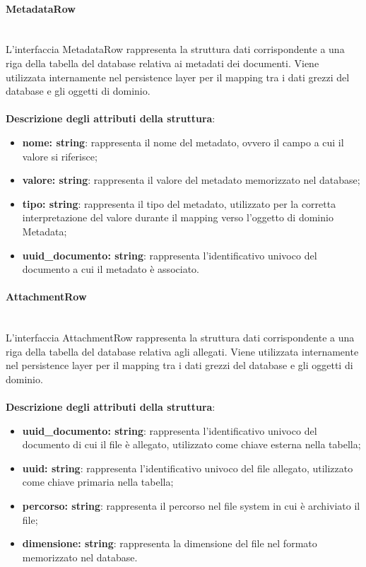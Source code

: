 \documentclass[a4paper,12pt]{article}
\begin{document}
{{{                \paragraph{MetadataRow}\label{par:MetadataRow}\mbox{}\\
                L'interfaccia MetadataRow rappresenta la struttura dati corrispondente a una riga della tabella del database relativa ai metadati dei documenti. Viene utilizzata internamente nel persistence layer per il mapping tra i dati grezzi del database e gli oggetti di dominio.\\
                \\
                \textbf{Descrizione degli attributi della struttura}:
                \begin{itemize}
                    \item \textbf{nome: string}: rappresenta il nome del metadato, ovvero il campo a cui il valore si riferisce;
                    \item \textbf{valore: string}: rappresenta il valore del metadato memorizzato nel database;
                    \item \textbf{tipo: string}: rappresenta il tipo del metadato, utilizzato per la corretta interpretazione del valore durante il mapping verso l'oggetto di dominio Metadata;
                    \item \textbf{uuid\_documento: string}: rappresenta l'identificativo univoco del documento a cui il metadato è associato.
                \end{itemize}
                \paragraph{AttachmentRow}\label{par:AttachmentRow}\mbox{}\\
                L'interfaccia AttachmentRow rappresenta la struttura dati corrispondente a una riga della tabella del database relativa agli allegati. Viene utilizzata internamente nel persistence layer per il mapping tra i dati grezzi del database e gli oggetti di dominio.\\
                \\
                \textbf{Descrizione degli attributi della struttura}:
                \begin{itemize}
                    \item \textbf{uuid\_documento: string}: rappresenta l'identificativo univoco del documento di cui il file è allegato, utilizzato come chiave esterna nella tabella;
                    \item \textbf{uuid: string}: rappresenta l'identificativo univoco del file allegato, utilizzato come chiave primaria nella tabella;
                    \item \textbf{percorso: string}: rappresenta il percorso nel file system in cui è archiviato il file;
                    \item \textbf{dimensione: string}: rappresenta la dimensione del file nel formato memorizzato nel database.
                \end{itemize}
}}}
\end{document}
